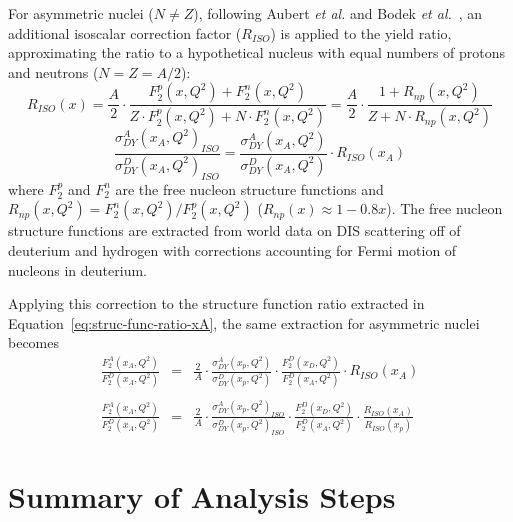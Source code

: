 
For asymmetric nuclei ($N\neq Z$), following Aubert \emph{et al.} and Bodek \emph{et al.}~\cite{Aubert:1983xm, PhysRevLett.50.1431}, an additional isoscalar correction factor ($R_{ISO}$) is applied to the yield ratio, approximating the ratio to a hypothetical nucleus with equal numbers of protons and neutrons ($N=Z=A/2$):
\begin{equation}
R_{ISO}(x) = \frac{A}{2} \cdot \frac{F_2^p(x, Q^2) + F_2^n(x, Q^2)}{Z\cdot F_2^p(x, Q^2) + N\cdot F_2^n(x,Q^2)} = \frac{A}{2} \cdot \frac{1+R_{np}(x, Q^2)}{Z + N\cdot R_{np}(x, Q^2)}
\end{equation}
\begin{equation}
\frac{\sigma^A_{DY}(x_A, Q^2)_{ISO}}{\sigma^D_{DY}(x_A, Q^2)_{ISO}} = \frac{\sigma^A_{DY}(x_A, Q^2)}{\sigma^D_{DY}(x_A, Q^2)} \cdot R_{ISO}(x_A)
\end{equation}
where $F_2^p$ and $F_2^n$ are the free nucleon structure functions and $R_{np}(x,Q^2) = F_2^n(x,Q^2)/F_2^p(x,Q^2)$ ($R_{np}(x)\approx 1 - 0.8 x$). The free nucleon structure functions are extracted from world data on DIS scattering\CN {} off of deuterium and hydrogen with corrections accounting for Fermi motion of nucleons in deuterium.

Applying this correction to the structure function ratio extracted in Equation~\ref{eq:struc-func-ratio-xA}, the same extraction for asymmetric nuclei becomes 
\begin{eqnarray}
\frac{F_2^A(x_A, Q^2)}{F_2^D(x_A, Q^2)} & = & \frac{2}{A} \cdot \frac{\sigma^A_{DY}(x_p, Q^2)}{\sigma^D_{DY}(x_p, Q^2)} \cdot \frac{F_2^D(x_D, Q^2)}{F_2^D(x_A, Q^2)} \cdot R_{ISO}(x_A) \\ 
& & \nonumber \\
\frac{F_2^A(x_A, Q^2)}{F_2^D(x_A, Q^2)} & = & \frac{2}{A} \cdot \frac{\sigma^A_{DY}(x_p, Q^2)_{ISO}}{\sigma^D_{DY}(x_p, Q^2)_{ISO}} \cdot \frac{F_2^D(x_D, Q^2)}{F_2^D(x_A, Q^2)} \cdot \frac{R_{ISO}(x_A) }{R_{ISO}(x_p)}
\end{eqnarray}

\section{Summary of Analysis Steps}

